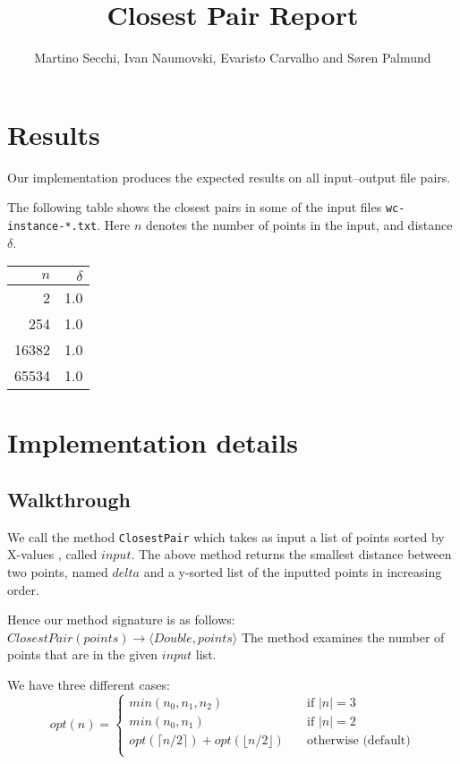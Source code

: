 \documentclass{tufte-handout}
\title{Closest Pair Report}
\author{Martino Secchi, Ivan Naumovski, Evaristo Carvalho and Søren Palmund}
\newcommand{\tuple}[1]{\langle#1\rangle}
\newcommand{\floor}[1]{\lfloor#1\rfloor}
\newcommand{\ceil}[1]{\lceil#1\rceil}
\begin{document}
\maketitle

  \section{Results}

  Our implementation produces the expected results on all input--output file pairs.

  The following table shows the closest pairs in some of the input files {\tt wc-instance-*.txt}.
  Here $n$ denotes the number of points in the input,
  and distance $\delta$.

  \bigskip\noindent
  \begin{tabular}{rr}\toprule
    $n$ & $\delta$ \\\midrule
    2 & 1.0 \\
    254 & 1.0 \\
    16382 & 1.0 \\
    65534 & 1.0 \\\bottomrule
  \end{tabular}


  \section{Implementation details}
    
  \subsection{Walkthrough}
  
  We call the method \verb+ClosestPair+ which takes as input a list of points sorted by X-values , called $input$. The above method returns the smallest distance between two points, named $delta$ and a y-sorted list of the inputted points in increasing order. \newline

Hence our method signature is as follows: $ClosestPair(points) \rightarrow \tuple{Double, points}$\newline
\noindent
 The method examines the number of points that are in the given $input$ list.\newline

We have three different cases:\newline \bigskip
\[
    opt(n) = 
    \begin{cases}
    	min(n_0, n_1, n_2)       			& \quad \text{if } |n| = 3\\
        min(n_0, n_1) 					& \quad \text{if } |n| = 2 \\
        opt( \ceil{n/2} ) + opt( \floor{n/2} )	& \quad \text{otherwise (default)} \\
    \end{cases}
\]\newline
\end{document}
